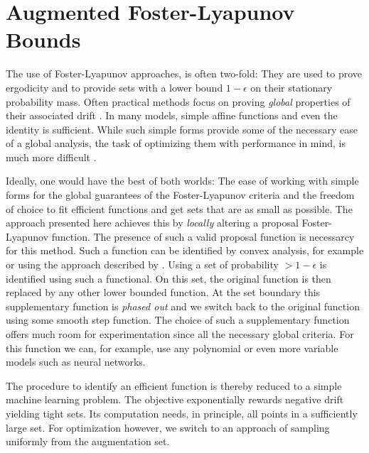 \section{Augmented Foster-Lyapunov Bounds}\label{ch:lyapunov}
The use of Foster-Lyapunov approaches, is often two-fold: They are
used to prove ergodicity and to provide sets with a lower bound
$1-\epsilon$ on their stationary probability mass.
Often practical methods focus on proving \emph{global} properties of
their associated drift \parencite{gupta2014scalable,spieler2014numerical}.
In many models, simple affine functions \parencite{gupta2017finite}
and even the identity \parencite{spieler2014numerical} is sufficient.
While such simple forms provide some of the necessary ease of a
global analysis, the task of optimizing them with performance in
mind, is much more difficult
\parencite{milias2014optimization}.

Ideally, one would have the best of both worlds: The ease of working
with simple forms for the global guarantees of the Foster-Lyapunov
criteria and the freedom of choice to fit efficient functions and get
sets that are as small as possible.
The approach presented here achieves this by \emph{locally} altering
a proposal Foster-Lyapunov function.
The presence of such a valid proposal function is necessarcy for this method.
Such a function can be identified by convex analysis, for example
\parencite{gupta2014scalable} or using the approach described by
\textcite{spieler2014numerical}.
Using a set of probability $>1-\epsilon$ is identified using such a functional.
On this set, the original function is then replaced by any other
lower bounded function.
At the set boundary this supplementary function is \emph{phased out}
and we switch back to the original function using some smooth step function.
The choice of such a supplementary function offers much room for
experimentation since all the necessary global criteria.
For this function we can, for example, use any polynomial or even
more variable models such as neural networks.

The procedure to identify an efficient function is thereby reduced to
a simple machine learning problem.
The objective exponentially rewards negative drift yielding tight sets.
Its computation needs, in principle, all points in a sufficiently large set.
For optimization however, we switch to an approach of sampling
uniformly from the augmentation set.

